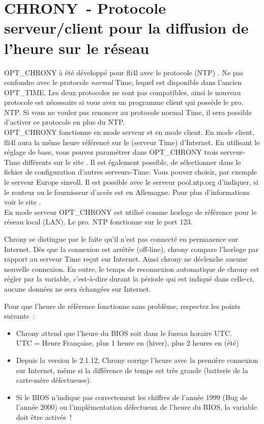 
{
\section {CHRONY~- Protocole serveur/client pour la diffusion de l'heure sur le réseau}
}

OPT\_CHRONY à été développé pour fli4l avec le protocole (NTP)
. Ne pas confondre avec le
protocole \emph{normal} Time, lequel est disponible dans l'ancien OPT\_TIME. Les
deux protocoles ne sont pas compatibles, ainsi le nouveau protocole est
nécessaire si vous avez un programme client qui possède le pro. NTP. Si vous ne
voulez pas renoncer au protocole normal Time, il sera possible d'activer ce
protocole en plus du NTP. \\ OPT\_CHRONY fonctionne en mode serveur et en mode
client. En mode client, fli4l aura la même heure référencé sur le (serveur Time)
d'Internet. En utilisant le réglage de base, vous pouvez paramétrer dans
OPT\_CHRONY trois serveur-Time différents sur le site
. Il est également possible, de
sélectionner dans le fichier de configuration d'autres serveurs-Time. Vous
pouvez choisir, par exemple le serveur Europe sinvoll. Il est possible avec le
serveur pool.ntp.org d'indiquer, si le routeur ou le fournisseur d'accès
est en Allemagne. Pour plus d'informations voir le site
. \\

En mode serveur OPT\_CHRONY est utilisé comme horloge de référence pour le
réseau local (LAN). Le pro. NTP fonctionne sur le port 123.

Chrony se distingue par le faite qu'il n'est pas connecté en permanence sur
Internet. Dès que la connexion est arrêtée (off-line), chrony compare l'horloge
par rapport au serveur Time reçut sur Internet. Ainsi chrony ne déclenche aucune
nouvelle connexion. En outre, le temps de reconnexion automatique de chrony est
régler par la variable, c'est-à-dire durant la période qui est
indiqué dans celle-ci, aucune données ne sera échangées sur Internet.

Pour que l'heure de référence fonctionne sans problème, respectez les points
suivants~:

\begin{itemize}
  \item Chrony attend que l'heure du BIOS soit dans le fuseau horaire UTC. \\
        UTC = Heure Française, plus 1 heure en (hiver), plus 2 heures en (été)
  \item Depuis la version le 2.1.12, Chrony corrige l'heure avec la première
        connexion sur Internet, même si la différence de temps est très grande
        (batterie de la carte-mère défectueuse).
  \item Si le BIOS n'indique pas correctement les chiffres de l'année 1999
        (Bug de l'année 2000) ou l'implémentation défectueux de l'heure du BIOS,
        la variable  doit être activés~!
\end{itemize}

